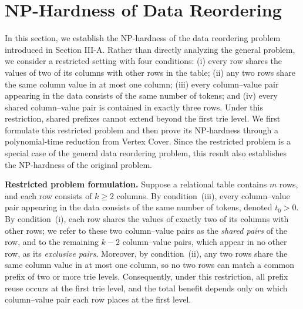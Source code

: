 \section{NP-Hardness of Data Reordering}
\label{sec:supp-np-hardness}

In this section, we establish the NP-hardness of the data reordering problem introduced in Section III-A. Rather than directly analyzing the general problem, we consider a restricted setting with four conditions: 
(i) every row shares the values of two of its columns with other rows in the table; (ii) any two rows share the same column value in at most one column; (iii) every column--value pair appearing in the data consists of the same number of tokens; and (iv) every shared column--value pair is contained in exactly three rows.
Under this restriction, shared prefixes cannot extend beyond the first trie level. We first formulate this restricted problem and then prove its NP-hardness through a polynomial-time reduction from Vertex Cover. 
Since the restricted problem is a special case of the general data reordering problem, this result also establishes the NP-hardness of the original problem.

\textbf{Restricted problem formulation.} 
Suppose a relational table contains $m$ rows, and each row consists of $k \geq 2$ columns. By condition~(iii), every column–value pair appearing in the data consists of the same number of tokens, denoted $t_0>0$. By condition~(i), each row shares the values of exactly two of its columns with other rows; we refer to these two column--value pairs as the \emph{shared pairs} of the row, and to the remaining $k-2$ column--value pairs, which appear in no other row, as its \emph{exclusive pairs}. Moreover, by condition~(ii), any two rows share the same column value in at most one column, so no two rows can match a common prefix of two or more trie levels. Consequently, under this restriction, all prefix reuse occurs at the first trie level, and the total benefit depends only on which column--value pair each row places at the first level.

